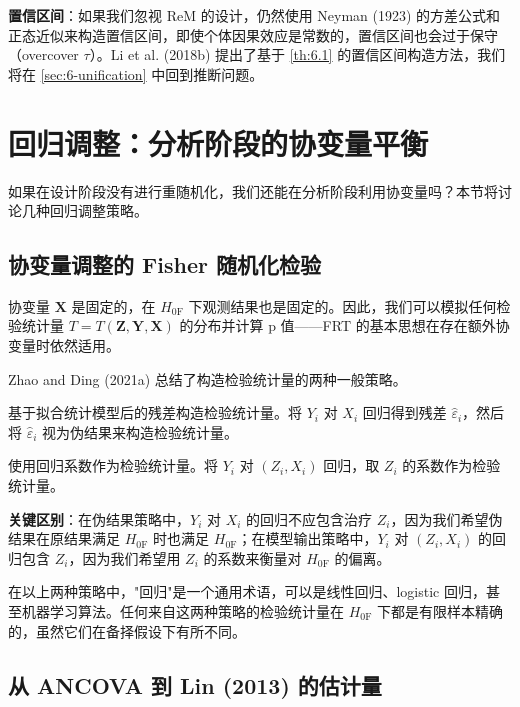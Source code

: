 \textbf{置信区间}：如果我们忽视 ReM 的设计，仍然使用 Neyman (1923) 的方差公式和正态近似来构造置信区间，即使个体因果效应是常数的，置信区间也会过于保守（overcover $\tau$）。Li et al. (2018b) 提出了基于 \cref{th:6.1} 的置信区间构造方法，我们将在 \cref{sec:6-unification} 中回到推断问题。

\section{回归调整：分析阶段的协变量平衡}\label{sec:6-reg-adjust}

如果在设计阶段没有进行重随机化，我们还能在分析阶段利用协变量吗？本节将讨论几种回归调整策略。

\subsection{协变量调整的 Fisher 随机化检验}\label{sec:6-frt-covariate}

协变量 $\mathbf{X}$ 是固定的，在 $H_{0\text{F}}$ 下观测结果也是固定的。因此，我们可以模拟任何检验统计量 $T = T(\mathbf{Z}, \mathbf{Y}, \mathbf{X})$ 的分布并计算 p 值——FRT 的基本思想在存在额外协变量时依然适用。

Zhao and Ding (2021a) 总结了构造检验统计量的两种一般策略。

\begin{Definition}\label{def:6-pseudo-outcome}
基于拟合统计模型后的残差构造检验统计量。将 $Y_i$ 对 $X_i$ 回归得到残差 $\hat{\varepsilon}_i$，然后将 $\hat{\varepsilon}_i$ 视为伪结果来构造检验统计量。
\end{Definition}

\begin{Definition}\label{def:6-model-output}
使用回归系数作为检验统计量。将 $Y_i$ 对 $(Z_i, X_i)$ 回归，取 $Z_i$ 的系数作为检验统计量。
\end{Definition}

\textbf{关键区别}：在伪结果策略中，$Y_i$ 对 $X_i$ 的回归不应包含治疗 $Z_i$，因为我们希望伪结果在原结果满足 $H_{0\text{F}}$ 时也满足 $H_{0\text{F}}$；在模型输出策略中，$Y_i$ 对 $(Z_i, X_i)$ 的回归包含 $Z_i$，因为我们希望用 $Z_i$ 的系数来衡量对 $H_{0\text{F}}$ 的偏离。

在以上两种策略中，"回归"是一个通用术语，可以是线性回归、logistic 回归，甚至机器学习算法。任何来自这两种策略的检验统计量在 $H_{0\text{F}}$ 下都是有限样本精确的，虽然它们在备择假设下有所不同。

\subsection{从 ANCOVA 到 Lin (2013) 的估计量}\label{sec:6-ancova-lin}

